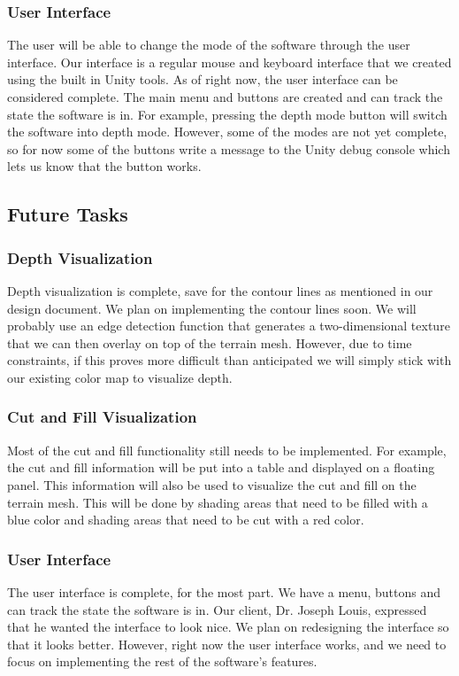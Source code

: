 \documentclass[onecolumn, draftclsnofoot,10pt, compsoc]{IEEEtran}
\begin{document}
\subsubsection{User Interface}
The user will be able to change the mode of the software through the user interface.
Our interface is a regular mouse and keyboard interface that we created using the built in Unity tools.
As of right now, the user interface can be considered complete.
The main menu and buttons are created and can track the state the software is in.
For example, pressing the depth mode button will switch the software into depth mode.
However, some of the modes are not yet complete, so for now some of the buttons write a message to the Unity debug console which lets us know that the button works.

\subsection{Future Tasks}

\subsubsection{Depth Visualization}
Depth visualization is complete, save for the contour lines as mentioned in our design document.
We plan on implementing the contour lines soon.
We will probably use an edge detection function that generates a two-dimensional texture that we can then overlay on top of the terrain mesh.
However, due to time constraints, if this proves more difficult than anticipated we will simply stick with our existing color map to visualize depth.

\subsubsection{Cut and Fill Visualization}
Most of the cut and fill functionality still needs to be implemented.
For example, the cut and fill information will be put into a table and displayed on a floating panel.
This information will also be used to visualize the cut and fill on the terrain mesh.
This will be done by shading areas that need to be filled with a blue color and shading areas that need to be cut with a red color.

\subsubsection{User Interface}
The user interface is complete, for the most part.
We have a menu, buttons and can track the state the software is in.
Our client, Dr. Joseph Louis, expressed that he wanted the interface to look nice.
We plan on redesigning the interface so that it looks better.
However, right now the user interface works, and we need to focus on implementing the rest of the software's features.
\end{document}
